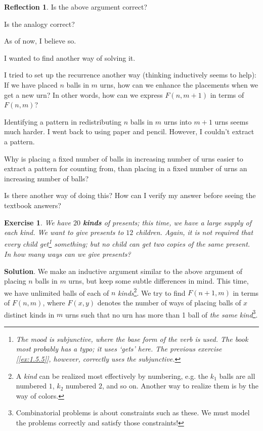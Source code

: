\documentclass[11pt]{book}
\theoremstyle{definition}
\theoremstyle{plain}
\newtheorem{exercise}{Exercise}
\theoremstyle{definition}
\theoremstyle{problemstyle}
\theoremstyle{remark}
\theoremstyle{definition}
\newtheorem{reflection}{Reflection}
\begin{document}
\begin{reflection}
    Is the above argument correct? 

    Is the analogy correct? 

    As of now, I believe so.

    I wanted to find another way of solving it.

    I tried to set up the recurrence another way (thinking inductively seems to help): If we have placed $n$ balls in $m$ urns, how can we enhance the placements when we get a new urn? In other words, how can we express $F(n, m+1)$ in terms of $F(n,m)$?

    Identifying a pattern in redistributing $n$ balls in $m$ urns into $m+1$ urns seems much harder. I went back to using paper and pencil. However, I couldn't extract a pattern.

    Why is placing a fixed number of balls in increasing number of urns easier to extract a pattern for counting from, than placing in a fixed number of urns an increasing number of balls?
    
    Is there another way of doing this? How can I verify my answer before seeing the textbook answers?
\end{reflection}

\begin{exercise}
    \label{ex:1.5.6}
    We have $20$ \textbf{kinds} of presents; this time, we have a large supply of each kind. We want to give presents to $12$ children. Again, it is not required that every child get\footnote{The mood is subjunctive, where the base form of the verb is used. The book most probably has a typo; it uses `gets' here. The previous exercise [\ref{ex:1.5.5}], however, correctly uses the subjunctive.} something; but no child can get two copies of the same present. In how many ways can we give presents?
\end{exercise}
\textbf{Solution}.
We make an inductive argument similar to the above argument of placing $n$ balls in $m$ urns, but keep some subtle differences in mind. This time, we have unlimited balls of each of $n$ \emph{kinds}\footnote{A \emph{kind} can be realized most effectively by numbering, e.g. the $k_1$ balls are all numbered $1$, $k_2$ numbered $2$, and so on. Another way to realize them is by the way of colors.}. We try to find $F(n+1,m)$ in terms of $F(n,m)$, where $F(x,y)$ denotes the number of ways of placing balls of $x$ distinct kinds in $m$ urns such that no urn has more than 1 ball of \emph{the same kind}\footnote{Combinatorial problems is about constraints such as these. We must model the problems correctly and satisfy those constraints!}.
\end{document}
